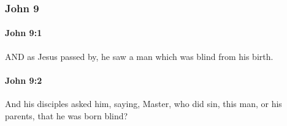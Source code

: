 	\subsubsection{John 9} %
		\label{JOHN-9}
		
		\paragraph{John 9:1} %
			\label{JOHN-9-1}

			AND as Jesus passed by, he saw a man which was blind from his birth.

			\begin{framed}
			\scriptsize
				\begin{compactdesc}
					\item[SBLG] 
				\end{compactdesc}
			\end{framed}

		\paragraph{John 9:2} %
			\label{JOHN-9-2}

			And his disciples asked him, saying, Master, who did sin, this man, or his parents, that he was born blind?

